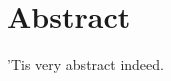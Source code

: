 \documentclass[../main.tex]{subfiles}
\begin{document}
\chapter*{Abstract}
'Tis very abstract indeed.
\end{document}
